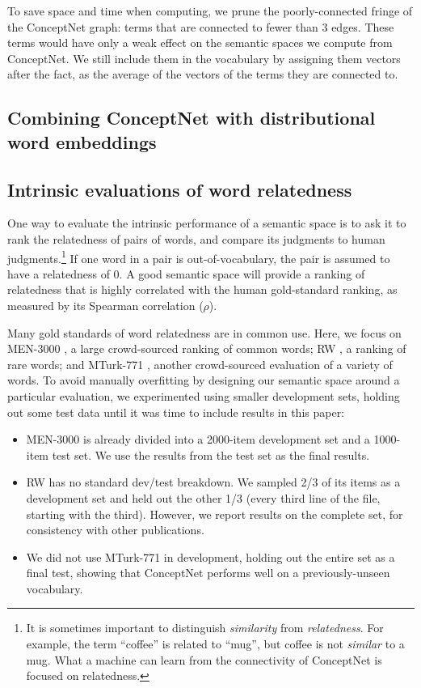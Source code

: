 \documentclass[letterpaper]{article}
\begin{document}
To save space and time when computing, we prune the poorly-connected fringe of
the ConceptNet graph: terms that are connected to fewer than 3 edges. These
terms would have only a weak effect on the semantic spaces we compute from
ConceptNet. We still include them in the vocabulary by assigning them vectors
after the fact, as the average of the vectors of the terms they are connected
to.

\subsection{Combining ConceptNet with distributional word embeddings}

\subsection{Intrinsic evaluations of word relatedness}
\label{intrinsic-evaluations}

One way to evaluate the intrinsic performance of a semantic space is to ask it
to rank the relatedness of pairs of words, and compare its judgments to human
judgments.\footnote{It is sometimes important to distinguish \emph{similarity}
from \emph{relatedness}. For example, the term ``coffee'' is related to
``mug'', but coffee is not \emph{similar} to a mug. What a machine can learn
from the connectivity of ConceptNet is focused on relatedness.} If one word in
a pair is out-of-vocabulary, the pair is assumed to have a relatedness of 0. A
good semantic space will provide a ranking of relatedness that is highly
correlated with the human gold-standard ranking, as measured by its Spearman
correlation ($\rho$).

Many gold standards of word relatedness are in common use. Here, we focus on
MEN-3000 \cite{bruni2014men}, a large crowd-sourced ranking of common words; RW
\cite{luong2013rw}, a ranking of rare words; and MTurk-771
\cite{halawi2012mturk}, another crowd-sourced evaluation of a variety of words.
To avoid manually overfitting by designing our semantic space around a
particular evaluation, we experimented using smaller development sets, holding
out some test data until it was time to include results in this paper:

\begin{itemize}
\item
    MEN-3000 is already divided into a 2000-item development set and a
    1000-item test set. We use the results from the test set as the final results.
\item
    RW has no standard dev/test breakdown. We sampled 2/3 of its items as
    a development set and held out the other 1/3 (every third line of the file,
    starting with the third). However, we report results on the complete set,
    for consistency with other publications.
\item
    We did not use MTurk-771 in development, holding out the entire set
    as a final test, showing that ConceptNet performs well on a
    previously-unseen vocabulary.
\end{itemize}
\end{document}
